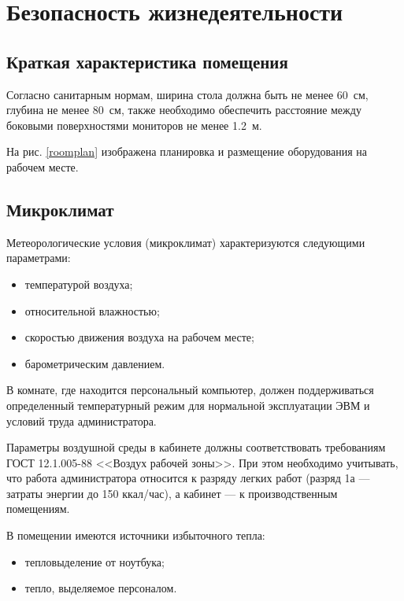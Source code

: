 \section{Безопасность жизнедеятельности}

\subsection{Краткая характеристика помещения}

Согласно санитарным нормам, ширина стола должна быть не менее 60~см, глубина не менее 80~см, также необходимо обеспечить расстояние между боковыми поверхностями мониторов не менее 1.2~м.

На рис. \ref{roomplan} изображена планировка и размещение оборудования на рабочем месте.

\subsection{Микроклимат}

Метеорологические условия (микроклимат) характеризуются следующими параметрами:
\begin{itemize}
  \item температурой воздуха;
  \item относительной влажностью;
  \item скоростью движения воздуха на рабочем месте;
  \item барометрическим давлением.
\end{itemize}

В комнате, где находится персональный компьютер, должен поддерживаться определенный температурный режим для нормальной эксплуатации ЭВМ и условий труда администратора.

Параметры воздушной среды в кабинете должны соответствовать требованиям ГОСТ 12.1.005-88 <<Воздух рабочей зоны>>.
При этом необходимо учитывать, что работа администратора относится к разряду легких работ (разряд 1а --- затраты энергии до 150 ккал/час), а кабинет --- к производственным помещениям.

В помещении имеются источники избыточного тепла:
\begin{itemize}
  \item тепловыделение от ноутбука;
  \item тепло, выделяемое персоналом.
\end{itemize}

